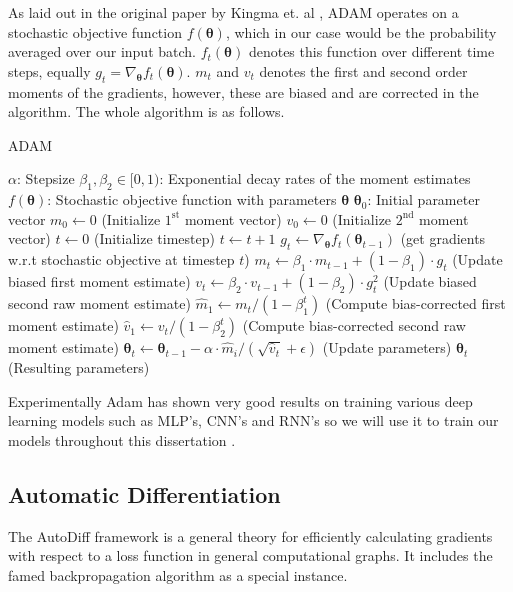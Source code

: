 As laid out in the original paper by Kingma et. al \cite{kingma_adam:_2014}, ADAM operates on a
stochastic objective function $f(\bm{\theta})$, which in our case would be the
probability averaged over our input batch. $f_t(\bm{\theta})$ denotes this
function over different time steps, equally $g_t = \nabla_{\bm{\theta}}
f_t(\bm{\theta})$. $m_t$ and $v_t$ denotes the first and second order moments of
the gradients, however, these are biased and are corrected in the algorithm.
The whole algorithm is as follows.
\begin{algorithm}[H]
  \caption{ADAM}\label{ADAM}
  \begin{algorithmic}[1]
    \Require $\alpha$: Stepsize
    \Require $\beta_1, \beta_2 \in [0, 1)$: Exponential decay rates of the moment estimates
    \Require $f(\bm{\theta})$: Stochastic objective function with parameters
    $\bm{\theta}$
    \Require $\bm{\theta}_0$: Initial parameter vector
    \State $m_0 \gets 0$ (Initialize $1^{\text{st}}$ moment vector)
    \State $v_0 \gets 0$ (Initialize $2^{\text{nd}}$ moment vector)
    \State $t \gets 0$ (Initialize timestep)
    \State $t \gets t + 1$
    \State $g_t \gets \nabla_{\bm{\theta}}f_t(\bm{\theta}_{t-1})$ (get gradients w.r.t stochastic objective at timestep $t$)
    \State $m_t \gets \beta_1 \cdot m_{t-1} + (1 - \beta_1) \cdot g_t$ (Update biased first moment estimate)
    \State $v_t \gets \beta_2 \cdot v_{t-1} + (1 - \beta_2) \cdot g^2_t$ (Update biased second raw moment estimate)
    \State $\hat{m}_1 \gets m_t / (1 - \beta^t_1)$ (Compute bias-corrected first moment estimate)
    \State $\hat{v}_1 \gets v_t / (1 - \beta^t_2)$ (Compute bias-corrected second raw moment estimate)
    \State $\bm{\theta}_t \gets \bm{\theta}_{t-1} - \alpha \cdot \hat{m}_i/(\sqrt{\hat{v}_t} + \epsilon)$ (Update parameters)
    \EndWhile
    \Return $\bm{\theta}_t$ (Resulting parameters)
  \end{algorithmic}
\end{algorithm}

Experimentally Adam has shown very good results on training various deep
learning models such as MLP's, CNN's and RNN's so we will use it to train our
models throughout this dissertation \cite{kingma_adam:_2014}.

\subsection{Automatic Differentiation}

The AutoDiff framework is a general theory for efficiently
calculating gradients with respect to a loss function in general computational graphs.
It includes the famed backpropagation \cite{Bishop:2006,
  Rumelhart:1986:LIR:104279.104293} algorithm as a special instance.

